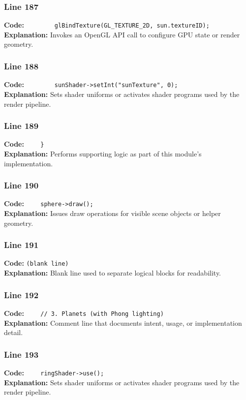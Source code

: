 \documentclass[11pt,a4paper]{article}
\begin{document}
\subsubsection*{Line 187}
\textbf{Code:} \verb|        glBindTexture(GL_TEXTURE_2D, sun.textureID);|\\
\textbf{Explanation:} Invokes an OpenGL API call to configure GPU state or render geometry.

\subsubsection*{Line 188}
\textbf{Code:} \verb|        sunShader->setInt("sunTexture", 0);|\\
\textbf{Explanation:} Sets shader uniforms or activates shader programs used by the render pipeline.

\subsubsection*{Line 189}
\textbf{Code:} \verb|    }|\\
\textbf{Explanation:} Performs supporting logic as part of this module's implementation.

\subsubsection*{Line 190}
\textbf{Code:} \verb|    sphere->draw();|\\
\textbf{Explanation:} Issues draw operations for visible scene objects or helper geometry.

\subsubsection*{Line 191}
\textbf{Code:} \texttt{(blank line)}\\
\textbf{Explanation:} Blank line used to separate logical blocks for readability.

\subsubsection*{Line 192}
\textbf{Code:} \verb|    // 3. Planets (with Phong lighting)|\\
\textbf{Explanation:} Comment line that documents intent, usage, or implementation detail.

\subsubsection*{Line 193}
\textbf{Code:} \verb|    ringShader->use();|\\
\textbf{Explanation:} Sets shader uniforms or activates shader programs used by the render pipeline.
\end{document}
